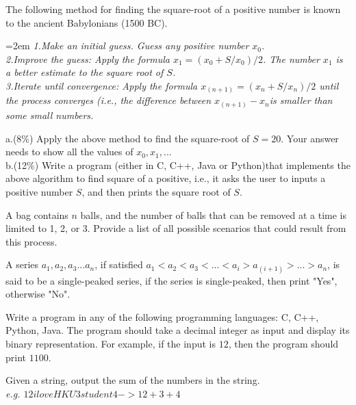 \documentclass{article}
\begin{document}
\vspace{5\baselineskip}


\noindent The following method for finding the square-root of a positive number is known to the ancient Babylonians (1500 BC).

\hangindent=2em %
\textit{1.Make an initial guess. Guess any positive number $x_0$.}\\
\textit{2.Improve the guess: Apply the formula $x_1 = (x_0+S/x_0) / 2$. The number $x_1$ is a better estimate to the square root of $S$.}\\
\textit{3.Iterate until convergence: Apply the formula $x_(n+1) = (x_n+S/x_n) / 2$ until the process converges (i.e., the difference between $x_(n+1)-x_n$is smaller than some small numbers.}

\noindent a.(8\%) Apply the above method to find the square-root of $S=20$. Your answer needs to show all the values of $x_0, x_1, ...$\\
\noindent b.(12\%) Write a program (either in C, C++, Java or Python)that implements the above algorithm to find square of a positive, i.e., it asks the user to inputs a positive number $S$, and then prints the square root of $S$.

\vspace{2\baselineskip}

\noindent A bag contains $n$ balls, and the number of balls that can be removed at a time is limited to 1, 2, or 3. Provide a list of all possible scenarios that could result from this process.

\vspace{2\baselineskip}

\noindent A series $a_1, a_2, a_3...a_n$, if satisfied $a_1 < a_2 <a_3 <...< a_i > a_(i+1) > ... > a_n$, is said to be a single-peaked series, if the series is single-peaked, then print "Yes", otherwise "No".

\vspace{2\baselineskip}

\noindent Write a program in any of the following programming languages: C, C++, Python, Java. The program should take a decimal integer as input and display its binary representation. For example, if the input is $12$, then the program should print $1100$.

\vspace{2\baselineskip}

\noindent Given a string, output the sum of the numbers in the string.\\
\textit{\fontsize{9pt}{12pt}\selectfont e.g. $12iloveHKU3student4 -> 12+3+4$}
\end{document}
